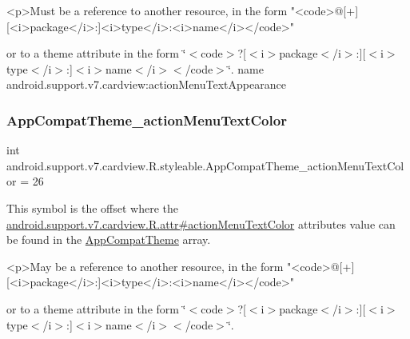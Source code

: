 \begin{DoxyVerb}      <p>Must be a reference to another resource, in the form "<code>@[+][<i>package</i>:]<i>type</i>:<i>name</i></code>"
\end{DoxyVerb}
 or to a theme attribute in the form \char`\"{}$<$code$>$?\mbox{[}$<$i$>$package$<$/i$>$\+:\mbox{]}\mbox{[}$<$i$>$type$<$/i$>$\+:\mbox{]}$<$i$>$name$<$/i$>$$<$/code$>$\char`\"{}.  name android.\+support.\+v7.\+cardview\+:action\+Menu\+Text\+Appearance \mbox{\label{classandroid_1_1support_1_1v7_1_1cardview_1_1R_1_1styleable_aba0a97a0706db940133aa5927746c78f}} 
\subsubsection{\texorpdfstring{App\+Compat\+Theme\+\_\+action\+Menu\+Text\+Color}{AppCompatTheme\_actionMenuTextColor}}
{\footnotesize\ttfamily int android.\+support.\+v7.\+cardview.\+R.\+styleable.\+App\+Compat\+Theme\+\_\+action\+Menu\+Text\+Color = 26\hspace{0.3cm}{\ttfamily [static]}}

This symbol is the offset where the \hyperlink{classandroid_1_1support_1_1v7_1_1cardview_1_1R_1_1attr_a0da5374357f02b6aaa09e3c863ee36dc}{android.\+support.\+v7.\+cardview.\+R.\+attr\#action\+Menu\+Text\+Color} attribute\textquotesingle{}s value can be found in the \hyperlink{classandroid_1_1support_1_1v7_1_1cardview_1_1R_1_1styleable_a52e6f69f954ecc2622d72c0b4d298938}{App\+Compat\+Theme} array.

\begin{DoxyVerb}      <p>May be a reference to another resource, in the form "<code>@[+][<i>package</i>:]<i>type</i>:<i>name</i></code>"
\end{DoxyVerb}
 or to a theme attribute in the form \char`\"{}$<$code$>$?\mbox{[}$<$i$>$package$<$/i$>$\+:\mbox{]}\mbox{[}$<$i$>$type$<$/i$>$\+:\mbox{]}$<$i$>$name$<$/i$>$$<$/code$>$\char`\"{}. 

